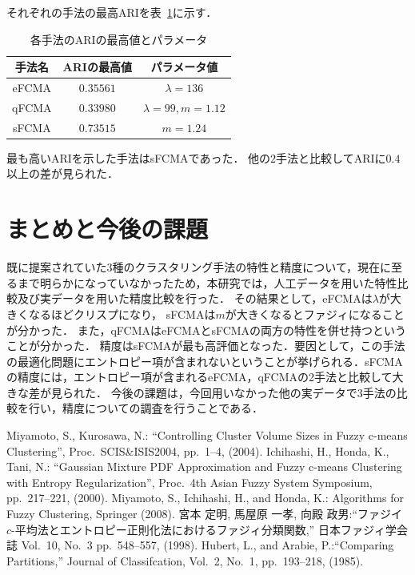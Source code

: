 \documentclass[twocolumn, a4paper]{icethesisabst}
\begin{document}
それぞれの手法の最高ARIを表~\ref{tbl:max_ari}に示す．

\begin{table}[htbp]
 \centering
 \caption{各手法のARIの最高値とパラメータ}
  \begin{center}
   \begin{tabular}{ c || c | c }\hline
    手法名 & ARIの最高値 & パラメータ値\\ \hline \hline
    eFCMA & $0.35561$& $\lambda = 136$\\ \hline  
    qFCMA & $0.33980$ & $\lambda = 99, m = 1.12$\\  \hline
    sFCMA & $0.73515$ & $m = 1.24$\\ \hline
   \end{tabular}
   \label{tbl:max_ari}
  \end{center}
\end{table}

最も高いARIを示した手法はsFCMAであった．
他の$2$手法と比較してARIに$0.4$以上の差が見られた．

\section{まとめと今後の課題}
既に提案されていた3種のクラスタリング手法の特性と精度について，現在に至るまで明らかになっていなかったため，本研究では，人工データを用いた特性比較及び実データを用いた精度比較を行った．
その結果として，eFCMAは$\lambda$が大きくなるほどクリスプになり，
sFCMAは$m$が大きくなるとファジィになることが分かった．
また，qFCMAはeFCMAとsFCMAの両方の特性を併せ持つということが分かった．
精度はsFCMAが最も高評価となった．要因として，この手法の最適化問題にエントロピー項が含まれないということが挙げられる．sFCMAの精度には，エントロピー項が含まれるeFCMA，qFCMAの2手法と比較して大きな差が見られた．
今後の課題は，今回用いなかった他の実データで$3$手法の比較を行い，精度についての調査を行うことである．

\begin{thebibliography}{99}
Miyamoto, S., Kurosawa, N.: ``Controlling Cluster Volume Sizes in Fuzzy c-means Clustering'', Proc.~SCIS\&ISIS2004, pp.~1--4, (2004).
Ichihashi, H., Honda, K., Tani, N.: ``Gaussian Mixture PDF Approximation and Fuzzy c-means Clustering with Entropy Regularization'', Proc.~4th Asian Fuzzy System Symposium, pp.~217--221, (2000).
Miyamoto, S., Ichihashi, H., and Honda, K.: Algorithms for Fuzzy Clustering, Springer (2008).
宮本 定明, 馬屋原 一孝, 向殿 政男:``ファジイ $c$-平均法とエントロピー正則化法におけるファジィ分類関数,''  日本ファジィ学会誌 Vol.~10, No.~3  pp.~548--557, (1998).
 Hubert, L., and Arabie, P.:``Comparing Partitions,'' Journal of Classifcation, Vol.~2, No.~1,
pp.~193--218, (1985).
\end{thebibliography}
\end{document}
